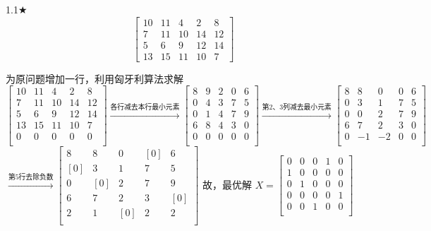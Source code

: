 \begin{problem}{1.1$\bigstar$}
    $$\begin{bmatrix}
        10 & 11 & 4  & 2  & 8 \\
        7  & 11 & 10 & 14 & 12\\
        5  & 6  & 9  & 12 & 14\\
        13 & 15 & 11 & 10 & 7
    \end{bmatrix}$$
\end{problem}
\begin{solution}
    为原问题增加一行，利用匈牙利算法求解
    $$\begin{bmatrix}
        10 & 11 & 4  & 2  & 8 \\
        7  & 11 & 10 & 14 & 12\\
        5  & 6  & 9  & 12 & 14\\
        13 & 15 & 11 & 10 & 7 \\
        0  & 0  & 0  & 0  & 0 \\
    \end{bmatrix}
    \xrightarrow{\text{各行减去本行最小元素}}
    \begin{bmatrix}
        8  & 9  & 2  & 0  & 6 \\
        0  & 4  & 3  & 7  & 5 \\
        0  & 1  & 4  & 7  & 9 \\
        6  & 8  & 4  & 3  & 0 \\
        0  & 0  & 0  & 0  & 0 \\
    \end{bmatrix}
    \xrightarrow{\text{第2、3列减去最小元素}}
    \begin{bmatrix}
        8  & 8  & 0  & 0  & 6 \\
        0  & 3  & 1  & 7  & 5 \\
        0  & 0  & 2  & 7  & 9 \\
        6  & 7  & 2  & 3  & 0 \\
        0  & -1 & -2 & 0  & 0 \\
    \end{bmatrix}$$
    $
    \xrightarrow{\text{第5行去除负数}}
    \begin{bmatrix}
        8  & 8  & 0  & [0]& 6 \\
        [0]& 3  & 1  & 7  & 5 \\
        0  & [0]& 2  & 7  & 9 \\
        6  & 7  & 2  & 3  & [0]\\
        2  & 1  & [0]& 2  & 2 \\
    \end{bmatrix}$
    故，最优解
    $X=\begin{bmatrix}
        0  & 0  & 0  & 1  & 0 \\
        1  & 0  & 0  & 0  & 0 \\
        0  & 1  & 0  & 0  & 0 \\
        0  & 0  & 0  & 0  & 1 \\
        0  & 0  & 1  & 0  & 0 \\
    \end{bmatrix}$
\end{solution}
